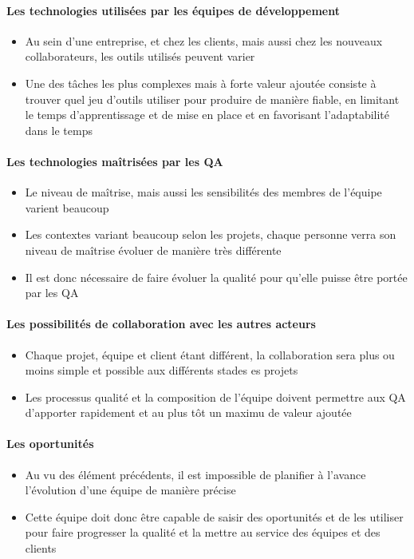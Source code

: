 \begin{frame}{\insertsectionhead}
  \framesubtitle{Les technologies utilisées par les équipes de développement}
  \begin{itemize}
    \item Au sein d'une entreprise, et chez les clients, mais aussi chez les nouveaux collaborateurs, les outils utilisés peuvent varier
    \item Une des tâches les plus complexes mais à forte valeur ajoutée consiste à trouver quel jeu d'outils utiliser pour produire de manière fiable, en limitant le temps d'apprentissage et de mise en place et en favorisant l'adaptabilité dans le temps
  \end{itemize}
\end{frame}

\begin{frame}{\insertsectionhead}
  \framesubtitle{Les technologies maîtrisées par les QA}
  \begin{itemize}
    \item Le niveau de maîtrise, mais aussi les sensibilités des membres de l'équipe varient beaucoup
    \item Les contextes variant beaucoup selon les projets, chaque personne verra son niveau de maîtrise évoluer de manière très différente
    \item Il est donc nécessaire de faire évoluer la qualité pour qu'elle puisse être portée par les QA
  \end{itemize}
\end{frame}

\begin{frame}{\insertsectionhead}
  \framesubtitle{Les possibilités de collaboration avec les autres acteurs}
  \begin{itemize}
    \item Chaque projet, équipe et client étant différent, la collaboration sera plus ou moins simple et possible aux différents stades es projets
    \item Les processus qualité et la composition de l'équipe doivent permettre aux QA d'apporter rapidement et au plus tôt un maximu de valeur ajoutée
  \end{itemize}
\end{frame}

\begin{frame}{\insertsectionhead}
  \framesubtitle{Les oportunités}
  \begin{itemize}
    \item Au vu des élément précédents, il est impossible de planifier à l'avance l'évolution d'une équipe de manière précise
    \item Cette équipe doit donc être capable de saisir des oportunités et de les utiliser pour faire progresser la qualité et la mettre au service des équipes et des clients
  \end{itemize}
\end{frame}

